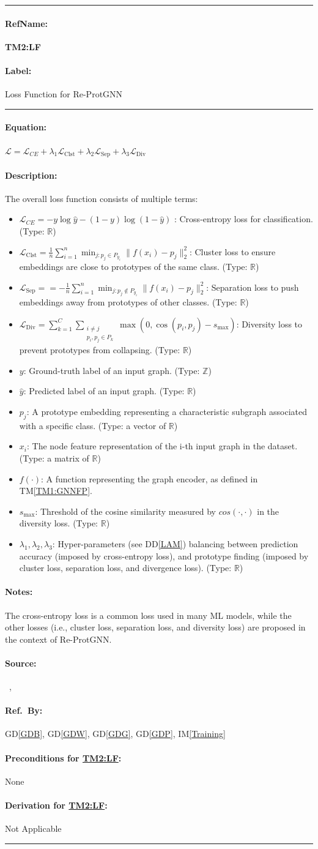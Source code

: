 \documentclass[12pt]{article}
\newcommand{\dref}[1]{GD\ref{#1}}
\newcommand{\ddref}[1]{DD\ref{#1}}
\newcommand{\tref}[1]{TM\ref{#1}}
\newcommand{\iref}[1]{IM\ref{#1}}
\newcommand{\deftheory}[9][Not Applicable]
{
\newpage
\noindent \rule{\textwidth}{0.5mm}

\paragraph{RefName: } \textbf{#2} \phantomsection 
\label{#2}

\paragraph{Label:} #3

\noindent \rule{\textwidth}{0.5mm}

\paragraph{Equation:}

#4

\paragraph{Description:}

#5

\paragraph{Notes:}

#6

\paragraph{Source:}

#7

\paragraph{Ref.\ By:}

#8

\paragraph{Preconditions for \hyperref[#2]{#2}:}
\label{#2_precond}

#9

\paragraph{Derivation for \hyperref[#2]{#2}:}
\label{#2_deriv}

#1

\noindent \rule{\textwidth}{0.5mm}

}
\begin{document}
\noindent
\deftheory
{TM2:LF}
{Loss Function for Re-ProtGNN}
{
  $\mathcal{L} = \mathcal{L}_{CE} + \lambda_1 \mathcal{L}_{\text{Clst}} + \lambda_2 \mathcal{L}_{\text{Sep}} + \lambda_3 \mathcal{L}_{\text{Div}}$
}
{
  The overall loss function consists of multiple terms:
\begin{itemize}
    \item \(\mathcal{L}_{CE} = -y \log \hat{y} - (1 - y) \log (1 - \hat{y})\) : Cross-entropy loss for classification. (Type: $\mathbb{R}$)
    \item \(\mathcal{L}_{\text{Clst}} = \frac{1}{n} \sum_{i=1}^{n} \min_{j : p_j \in P_{y_i}} \| f(x_i) - p_j \|_2^2 \): Cluster loss to ensure embeddings are close to prototypes of the same class. (Type: $\mathbb{R}$)
    \item \(\mathcal{L}_{\text{Sep}} = = -\frac{1}{n} \sum_{i=1}^{n} \min_{j : p_j \notin P_{y_i}} \| f(x_i) - p_j \|_2^2 \): Separation loss to push embeddings away from prototypes of other classes. (Type: $\mathbb{R}$)
    \item \(\mathcal{L}_{\text{Div}} = \sum_{k=1}^{C} \sum_{\substack{i \neq j \\ p_i, p_j \in P_k}} \max(0, \cos(p_i, p_j) - s_{\max})\): Diversity loss to prevent prototypes from collapsing. (Type: $\mathbb{R}$)
    \item \(y\): Ground-truth label of an input graph. (Type: $\mathbb{Z}$)
    \item \(\hat{y}\): Predicted label of an input graph. (Type: $\mathbb{R}$)
    \item \(p_j\): A prototype embedding representing a characteristic subgraph associated with a specific class. (Type: a vector of $\mathbb{R}$)
    \item \(x_i\): The node feature representation of the i-th input graph in the dataset. (Type: a matrix of $\mathbb{R}$)
    \item \(f(\cdot)\): A function representing the graph encoder, as defined in \tref{TM1:GNNFP}.
    \item \(s_{\max}\): Threshold of the cosine similarity measured by \(cos(\cdot, \cdot)\) in the diversity loss. (Type: $\mathbb{R}$)
    \item \(\lambda_1, \lambda_2, \lambda_3\): Hyper-parameters (see \ddref{LAM}) balancing between prediction accuracy (imposed by cross-entropy loss), and prototype finding (imposed by cluster loss, separation loss, and divergence loss). (Type: $\mathbb{R}$)
\end{itemize}
}
{
The cross-entropy loss is a common loss used in many ML models, while the other losses (i.e., cluster loss, separation loss, and diversity loss) are proposed in the context of Re-ProtGNN.
}
{
  ~\cite{wikipedia_crossentropy}, ~\cite{zhang2022}
}
{
  \dref{GDB}, \dref{GDW}, \dref{GDG}, \dref{GDP}, \iref{Training}
}
{
None
}
{}
\end{document}
